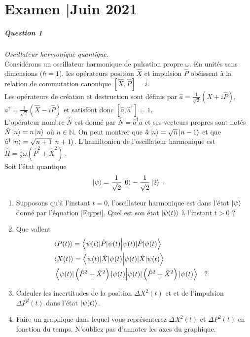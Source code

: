 
\chapter*{Examen \hsp\textcolor{gray75}{|}\hsp Juin 2021}

\paragraph{Question 1} \textit{Oscillateur harmonique quantique.} \\

Considérons un oscillateur harmonique de pulsation propre $\omega$. En unités sans dimensions ($\hbar=1$), les opérateurs position $\hat X$ et impulsion $\hat P$ obéissent à la relation de commutation canonique $[\hat X, \hat P]=i $. \\

Les opérateurs de création et destruction sont définis par 
$\hat a= \frac{1}{\sqrt{2}}(\hat X+i\hat P)$, $a^\dagger= \frac{1}{\sqrt{2}}(\hat X-i\hat P)$ et satisfont donc $[\hat a,\hat a^\dagger]=1$. \\

L'opérateur nombre $\hat N$ est donné par $\hat N= \hat a^\dagger \hat a$ et ses vecteurs propres sont notés $\hat N \ket{n} =n \ket{n}$ où $n \in \mathbb{N}$. On peut montrer que $\hat a \ket{n} =\sqrt{n} \ket{n-1}$ et que $\hat a^\dagger \ket{n} =\sqrt{n+1} \ket{n+1}$. L'hamiltonien de l'oscillateur harmonique est $\hat H = \frac{1}{2}\omega ( \hat P^2 + \hat X^2 )\ $. \\

Soit l'état quantique 
\begin{equation}
\vert \psi \rangle = 
 \frac{1}{\sqrt{2}}\ket{0}  - \frac{1}{\sqrt{2}}\ket{2} \ .
 \label{Eq:psi}
\end{equation}

\begin{enumerate}


\item 
Supposons qu'à l'instant $t=0$, l'oscillateur harmonique est dans l'état $\ket{\psi}$ donné par l'équation \eqref{Eq:psi}. Quel est son état $\ket{\psi(t)}$ à l'instant $t>0$ ?

\item 
Que vallent 
\begin{eqnarray}
&\langle P(t) \rangle = \braket{\psi (t)|\hat P|\psi(t)}&\\
&\langle X(t) \rangle = \braket{\psi(t)|\hat X|\psi(t)}&\\
&\braket{\psi(t)|\left( \hat P^2 + \hat X^2\right)|\psi(t)}\quad  ?&
\end{eqnarray}

\item 
Calculer les incertitudes de la position $\Delta X^2(t)$ et 
et de l'impulsion $\Delta P^2(t)$ dans l'état $\ket{\psi(t)}$.


\item Faire un graphique dans lequel vous représenterez  $\Delta X^2(t)$ et $\Delta P^2(t)$ en fonction du temps. N'oubliez pas d'annoter les axes du graphique.

\end{enumerate}

